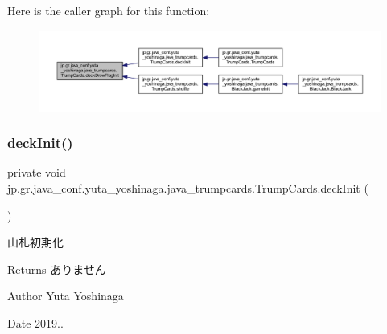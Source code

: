 Here is the caller graph for this function\+:
\nopagebreak
\begin{figure}[H]
\begin{center}
\leavevmode
\includegraphics[width=350pt]{classjp_1_1gr_1_1java__conf_1_1yuta__yoshinaga_1_1java__trumpcards_1_1_trump_cards_aa1db686e11e2c281976505d527eaffbd_icgraph}
\end{center}
\end{figure}
\mbox{\label{classjp_1_1gr_1_1java__conf_1_1yuta__yoshinaga_1_1java__trumpcards_1_1_trump_cards_af1a1d8299e1e79a272351c9e4b4026fa}} 
\subsubsection{\texorpdfstring{deck\+Init()}{deckInit()}}
{\footnotesize\ttfamily private void jp.\+gr.\+java\+\_\+conf.\+yuta\+\_\+yoshinaga.\+java\+\_\+trumpcards.\+Trump\+Cards.\+deck\+Init (\begin{DoxyParamCaption}{ }\end{DoxyParamCaption})\hspace{0.3cm}{\ttfamily [private]}}



山札初期化 

\begin{DoxyReturn}{Returns}
ありません 
\end{DoxyReturn}
\begin{DoxyAuthor}{Author}
Yuta Yoshinaga 
\end{DoxyAuthor}
\begin{DoxyDate}{Date}
2019.. 
\end{DoxyDate}


